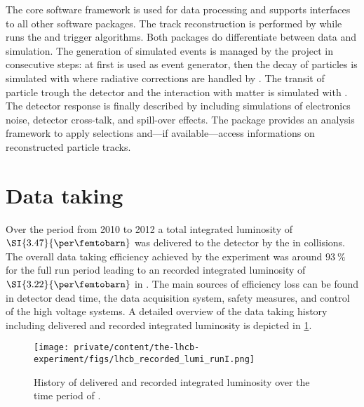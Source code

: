 The \LHCb core software framework \Gaudi \cite{set:soft:gaudi} is used for data
processing and supports interfaces to all other software packages. The track
reconstruction is performed by \Brunel \cite{soft:brunel} while \Moore
\cite{soft:moore} runs the \HLTOne and \HLTTwo trigger algorithms. Both packages
do differentiate between data and simulation. The generation of simulated events
is managed by the \Gauss \cite{set:soft:gauss} project in consecutive steps: at
first \Pythia \cite{set:soft:pythia} is used as event generator, then the decay
of particles is simulated with \EvtGen \cite{Lange:2001uf} where radiative
corrections are handled by \Photos \cite{set:soft:photos}. The transit of
particle trough the detector and the interaction with matter is simulated with
\GeantFour \cite{set:soft:geantfour}. The detector response is finally described
by \Boole \cite{soft:boole} including simulations of electronics noise, detector
cross-talk, and spill-over effects. The \DaVinci \cite{soft:davinci} package
provides an analysis framework to apply selections and---if available---access
\MC informations on reconstructed particle tracks.

\section{Data taking}
\label{sec:lhcb_experiment:data}

Over the \RunOne period from 2010 to 2012 a total integrated luminosity of
$\SI{3.47}{\per\femtobarn}$ was delivered to the \LHCb detector by the \LHC in
\protonproton collisions. The overall data taking efficiency achieved by the
experiment was around $\SI{93}{\percent}$ for the full run period leading to an
recorded integrated luminosity of $\SI{3.22}{\per\femtobarn}$ in \RunOne. The
main sources of efficiency loss can be found in detector dead time, the data
acquisition system, \VELO safety measures, and control of the high voltage
systems. A detailed overview of the data taking history including delivered and
recorded integrated luminosity is depicted in
\cref{fig:lhcb_experiment:data:integrated_lumi}.
%
\begin{figure}[t]
  \centering
  \texttt{[image: private/content/the-lhcb-experiment/figs/lhcb\_recorded\_lumi\_runI.png]}
  \caption{
    History of delivered and recorded integrated luminosity over the time period of \RunOne.
  }
  \label{fig:lhcb_experiment:data:integrated_lumi}
\end{figure}


